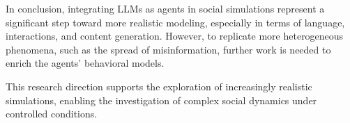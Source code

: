 \medskip
In conclusion, integrating LLMs as agents in social simulations represent a significant step toward more realistic modeling, especially in terms of language, interactions, and content generation.
However, to replicate more heterogeneous phenomena, such as the spread of misinformation, further work is needed to enrich the agents' behavioral models.

This research direction supports the exploration of increasingly realistic simulations, enabling the investigation of complex social dynamics under controlled conditions. 

\newpage